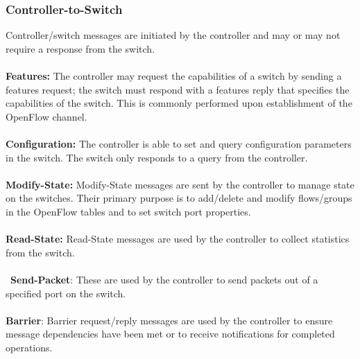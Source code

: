 \documentclass[10pt]{article}
\begin{document}
\subsubsection{Controller-to-Switch}
Controller/switch messages are initiated by the controller and may or may not require a response from the switch.
\\\\
\textbf{Features:}  The controller may request the capabilities of a switch by sending a features request; the switch must respond with a features reply that specifies the capabilities of the switch. This is commonly performed upon establishment of the OpenFlow channel.
\\\\
\textbf{Configuration:} The controller is able to set and query configuration parameters in the switch.  The switch only responds to a query from the controller.
\\\\
\textbf{Modify-State:} Modify-State messages are sent by the controller to manage state on the switches.  Their primary purpose is to add/delete and modify flows/groups in the OpenFlow tables and to set switch port properties.
\\\\
\textbf{Read-State:} Read-State messages are used by the controller to collect statistics from the switch.
\\\\\
\textbf{Send-Packet}:  These are used by the controller to send packets out of a specified port on the switch.
\\\\
\textbf{Barrier}: Barrier request/reply messages are used by the controller to ensure message dependencies have been met or to receive notifications for completed operations.  
\end{document}
